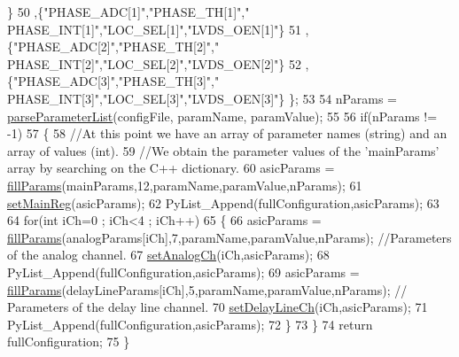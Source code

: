 \begin{DoxyCode}
      \}
50                                                                 ,\{\textcolor{stringliteral}{"PHASE\_ADC[1]"},\textcolor{stringliteral}{"PHASE\_TH[1]"},\textcolor{stringliteral}{"
      PHASE\_INT[1]"},\textcolor{stringliteral}{"LOC\_SEL[1]"},\textcolor{stringliteral}{"LVDS\_OEN[1]"}\}
51                                                                 ,\{\textcolor{stringliteral}{"PHASE\_ADC[2]"},\textcolor{stringliteral}{"PHASE\_TH[2]"},\textcolor{stringliteral}{"
      PHASE\_INT[2]"},\textcolor{stringliteral}{"LOC\_SEL[2]"},\textcolor{stringliteral}{"LVDS\_OEN[2]"}\}
52                                                                 ,\{\textcolor{stringliteral}{"PHASE\_ADC[3]"},\textcolor{stringliteral}{"PHASE\_TH[3]"},\textcolor{stringliteral}{"
      PHASE\_INT[3]"},\textcolor{stringliteral}{"LOC\_SEL[3]"},\textcolor{stringliteral}{"LVDS\_OEN[3]"}\}               \};
53 
54     nParams = \hyperlink{classICECALv3_a313e8166af1ce26b4026f883ad900fb9}{parseParameterList}(configFile, paramName, paramValue);
55 
56     \textcolor{keywordflow}{if}(nParams != -1)
57     \{
58         \textcolor{comment}{//At this point we have an array of parameter names (string) and an array of values (int).}
59         \textcolor{comment}{//We obtain the parameter values of the 'mainParams' array by searching on the C++ dictionary.}
60         asicParams = \hyperlink{classICECALv3_ac006abc42a048308427f6801d783a407}{fillParams}(mainParams,12,paramName,paramValue,nParams);
61         \hyperlink{classICECALv3_a479f7e17669da4b785af840049d39cb4}{setMainReg}(asicParams);
62         PyList\_Append(fullConfiguration,asicParams);
63 
64         \textcolor{keywordflow}{for}(\textcolor{keywordtype}{int} iCh=0 ; iCh<4 ; iCh++)
65         \{
66             asicParams = \hyperlink{classICECALv3_ac006abc42a048308427f6801d783a407}{fillParams}(analogParams[iCh],7,paramName,paramValue,nParams);            \textcolor{comment}{
      //Parameters of the analog channel.}
67             \hyperlink{classICECALv3_a9578e4d13c250d8bc417f68c79d6a21d}{setAnalogCh}(iCh,asicParams);
68             PyList\_Append(fullConfiguration,asicParams);
69             asicParams = \hyperlink{classICECALv3_ac006abc42a048308427f6801d783a407}{fillParams}(delayLineParams[iCh],5,paramName,paramValue,nParams);     \textcolor{comment}{//
      Parameters of the delay line channel.}
70             \hyperlink{classICECALv3_a14a7a29c9a3412c062f053cc616b860a}{setDelayLineCh}(iCh,asicParams);       
71             PyList\_Append(fullConfiguration,asicParams);
72         \}
73     \}
74     \textcolor{keywordflow}{return} fullConfiguration;
75 \}
\end{DoxyCode}
\mbox{\label{classObject_a58b2d0618c2d08cf2383012611528d97}} 
